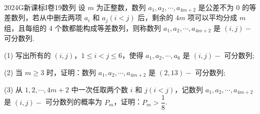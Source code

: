 
\begin{problem}{2024}{G}{新课标I卷}{19}{数列}
设 $m$ 为正整数，数列 $a_1, a_2, \cdots, a_{4m+2}$ 是公差不为 0 的等差数列，若从中删去两项 $a_i$ 和 $a_j(i<j)$ 后，剩余的 $4m$ 项可以平均分成 $m$ 组，且每组的 4 个数都能构成等差数列，则称数列 $a_1, a_2, \cdots, a_{4m+2}$ 是 $(i,j)-$ 可分数列.

(1) 写出所有的 $(i,j)$，$1\leqslant i<j \leqslant 6$，使得 $a_1, a_2, \cdots, a_6$ 是 $(i,j)-$ 可分数列;

(2) 当 $m\geqslant 3$ 时，证明：数列 $a_1, a_2, \cdots, a_{4m+2}$ 是 $(2,13)-$ 可分数列;

(3) 从 $1, 2, \cdots, 4m+2$ 中一次任取两个数 $i$ 和 $j(i<j)$，记数列 $a_1, a_2, \cdots, a_{4m+2}$ 是 $(i,j)-$ 可分数列的概率为 $P_m$，证明：$P_m>\dfrac{1}{8}$.
\end{problem}
